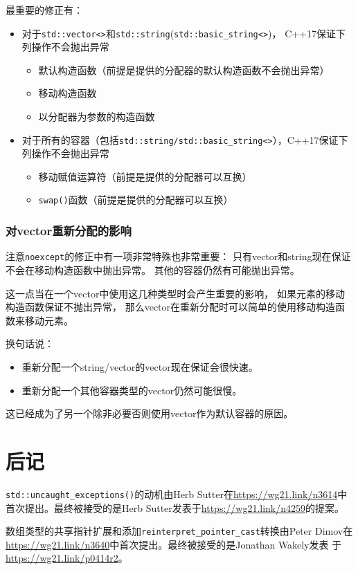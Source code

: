 最重要的修正有：
\begin{itemize}
    \item 对于\texttt{std::vector<>}和\texttt{std::string}(\texttt{std::basic\_string<>})，
    C++17保证下列操作不会抛出异常
    \begin{itemize}
        \item 默认构造函数（前提是提供的分配器的默认构造函数不会抛出异常）
        \item 移动构造函数
        \item 以分配器为参数的构造函数
    \end{itemize}
    \item 对于所有的容器（包括\texttt{std::string/std::basic\_string<>}），C++17保证下列操作不会抛出异常
    \begin{itemize}
        \item 移动赋值运算符（前提是提供的分配器可以互换）
        \item \texttt{swap()}函数（前提是提供的分配器可以互换）
    \end{itemize}
\end{itemize}

\subsubsection{对vector重新分配的影响}
注意\texttt{noexcept}的修正中有一项非常特殊也非常重要：
只有vector和string现在保证不会在移动构造函数中抛出异常。
其他的容器仍然有可能抛出异常。

这一点当在一个vector中使用这几种类型时会产生重要的影响，
如果元素的移动构造函数保证不抛出异常，
那么vector在重新分配时可以简单的使用移动构造函数来移动元素。

换句话说：
\begin{itemize}
    \item 重新分配一个string/vector的vector现在保证会很快速。
    \item 重新分配一个其他容器类型的vector仍然可能很慢。
\end{itemize}
这已经成为了另一个除非必要否则使用vector作为默认容器的原因。

\section{后记}
\texttt{std::uncaught\_exceptions()}的动机由Herb Sutter在\url{https://wg21.link/n3614}中
首次提出。最终被接受的是Herb Sutter发表于\url{https://wg21.link/n4259}的提案。

数组类型的共享指针扩展和添加\texttt{reinterpret\_pointer\_cast}转换由Peter Dimov在
\url{https://wg21.link/n3640}中首次提出。最终被接受的是Jonathan Wakely发表
于\url{https://wg21.link/p0414r2}。

